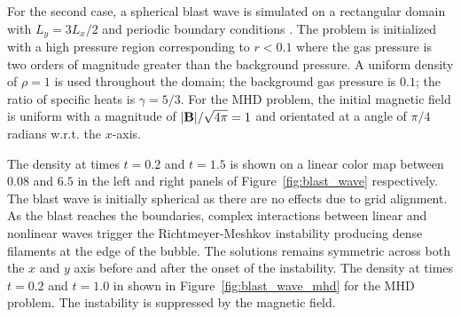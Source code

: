 For the second case, a spherical blast wave is simulated on a rectangular domain with $L_y = 3L_x/2$ and periodic boundary conditions \citep{Zachary:1994,Balsara:1999,Londrillo:2000}.  The problem is initialized with a high pressure region corresponding to $r < 0.1$ where the gas pressure is two orders of magnitude greater than the background pressure.  A uniform density of $\rho = 1$ is used throughout the domain; the background gas pressure is $0.1$; the ratio of specific heats is $\gamma = 5/3$.  For the MHD problem, the initial magnetic field is uniform with a magnitude of $|\mathbf{B}|/\sqrt{4\pi} = 1$ and orientated at a angle of $\pi/4$ radians w.r.t. the $x$-axis.

The density at times $t = 0.2$ and $t = 1.5$ is shown on a linear color map between $0.08$ and $6.5$ in the left and right panels of Figure~\ref{fig:blast_wave} respectively.  The blast wave is initially spherical as there are no effects due to grid alignment.  As the blast reaches the boundaries, complex interactions between linear and nonlinear waves trigger the Richtmeyer-Meshkov instability \citep{Richtmyer:1960,Meshkov:1969} producing dense filaments at the edge of the bubble.  The solutions remains symmetric across both the $x$ and $y$ axis before and after the onset of the instability.  The density at times $t = 0.2$ and $t=1.0$ in shown in Figure~\ref{fig:blast_wave_mhd} for the MHD problem.  The instability is suppressed by the magnetic field.

